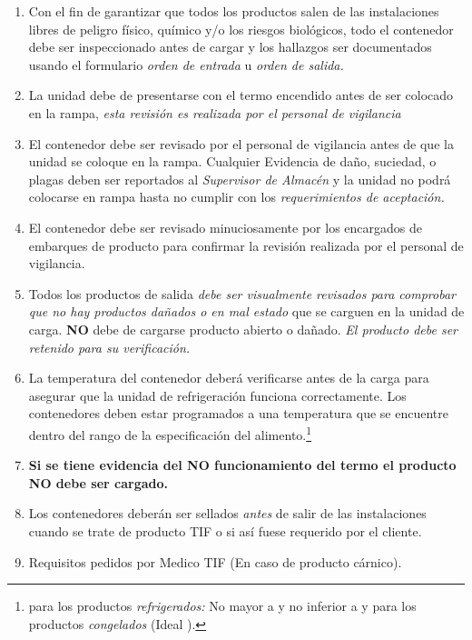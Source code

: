 \begin{enumerate}
	\item Con el fin de garantizar que todos los productos salen de las instalaciones libres de peligro físico, químico y/o los riesgos biológicos, todo el contenedor debe ser inspeccionado antes de cargar y los hallazgos ser documentados usando el formulario \emph{orden de entrada} u \emph{orden de salida.}
	\item La unidad debe de presentarse con el termo encendido antes de ser colocado en la rampa, \emph{esta revisión es realizada por el personal de vigilancia}
	\item El contenedor debe ser revisado por el personal de vigilancia antes de que la unidad se coloque en la rampa.
	Cualquier Evidencia de daño, suciedad, o plagas deben ser reportados al \emph{Supervisor de Almacén} y la unidad no podrá colocarse en rampa hasta no cumplir con los \emph{requerimientos de aceptación.}
	\item El contenedor debe ser revisado minuciosamente por los encargados de embarques de producto para confirmar la revisión realizada por el personal de vigilancia.
	\item Todos los productos de salida \emph{debe ser visualmente revisados para comprobar que no hay productos dañados o en mal estado} que se carguen en la unidad de carga. \textbf{NO} debe de cargarse producto abierto o dañado. \emph{El producto debe ser retenido para su verificación.}
	\item La temperatura del contenedor deberá verificarse antes de la carga para asegurar que la unidad de refrigeración funciona correctamente. Los contenedores deben estar programados a una temperatura que se encuentre dentro del rango de la especificación del \gls{alimento}.\footnote{para los productos \emph{refrigerados:} No mayor a  y no inferior a  y para los productos \emph{congelados}  (Ideal ).}
	\item \textbf{Si se tiene evidencia del NO funcionamiento del termo el producto NO debe ser cargado.}
	\item Los contenedores deberán ser sellados \emph{antes} de salir de las instalaciones cuando se trate de producto TIF o si así fuese requerido por el cliente.
	\item Requisitos pedidos por Medico TIF (En caso de producto cárnico).
\end{enumerate}

